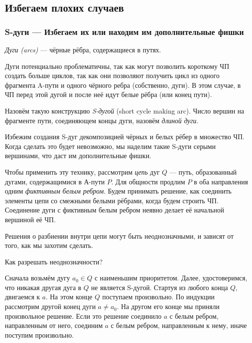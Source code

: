 \begin{proofstar}
\subsection{Избегаем плохих случаев}
\subsubsection{S-дуги --- Избегаем их или находим им дополнительные фишки}

\begin{defn}
\textit{Дуги (arcs)} --- чёрные рёбра, содержащиеся в путях.
\end{defn}

Дуги потенциально проблематичны, так как могут позволить короткому ЧП создать больше циклов, так как они позволяют получить цикл из одного фрагмента A-пути и одного чёрного ребра (собственно, дуги). В этом случае, в ЧП перед этой дугой и после неё идут белые рёбра (или конец пути). 
\begin{defn}
Назовём такую конструкцию \textit{S-дугой} (short cycle making arc). Число вершин на фрагменте пути, соединяющем концы дуги, назовём \textit{длиной дуги}.
\end{defn}

Избежим создания S-дуг декомпозицией чёрных и белых рёбер в множество ЧП. Когда сделать это будет невозможно, мы наделим такие S-дуги серыми вершинами, что даст им дополнительные фишки. 

Чтобы применить эту технику, рассмотрим \textit{цепь} дуг $Q$ ---  путь, образованный дугами, содержащимися в А-пути $P$. Для общности продлим $P$ в оба направления одним \textit{фиктивным белым ребром}. Будем принимать решение, как соединить элементы цепи со смежными белыми рёбрами, когда будем строить ЧП. Соединение дуги с фиктивным белым ребром неявно делает её начальной вершиной её ЧП.

\begin{note}
Решения о разбиении внутри цепи могут быть неоднозначными, и зависят от того, как мы захотим сделать.
\end{note}

Как разрешать неоднозначности?

Сначала возьмём дугу $a_0 \in Q$ с наименьшим приоритетом. Далее, удостоверимся, что никакая другая дуга в $Q$ не является S-дугой. Стартуя из любого конца $Q$, двигаемся к $a$. На этом конце $Q$ поступаем произвольно. По индукции рассмотрим другой конец дуги $a \ne a_0$. На другом его конце мы приняли произвольное решение. Если это решение соединило $a$ с белым ребром, направленным от него, соединим $a$ с белым ребром, направленным к нему, иначе поступим произвольно.


\end{proofstar}
